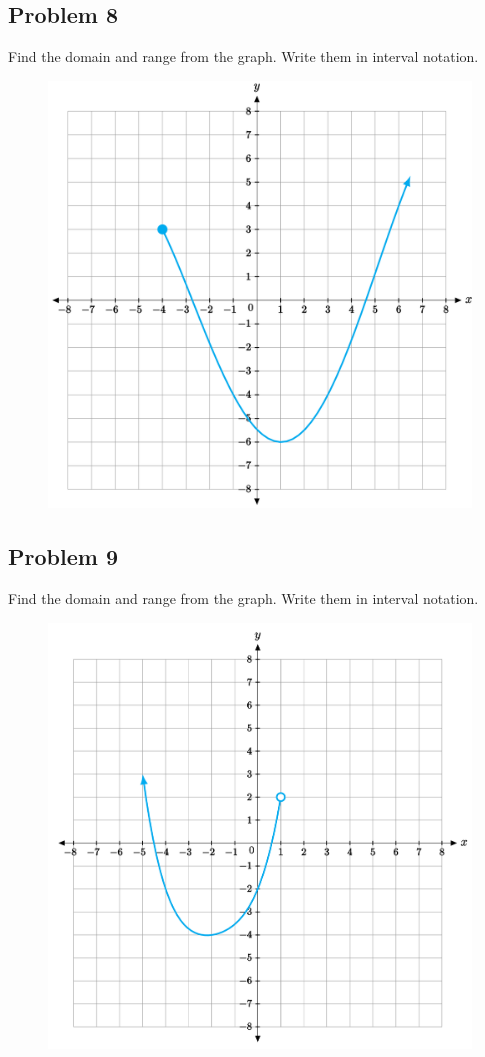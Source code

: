 \documentclass[12pt]{article}
\begin{document}
\subsection*{Problem 8}
Find the domain and range from the graph. Write them in interval notation.

\begin{figure}[!ht]
    \centering
    \includegraphics[width=\textwidth]{1.png}
\end{figure}



\subsection*{Problem 9}
Find the domain and range from the graph. Write them in interval notation.
\begin{figure}[!ht]
    \centering
    \includegraphics[width=0.7\linewidth]{2.png}
\end{figure}
\end{document}
